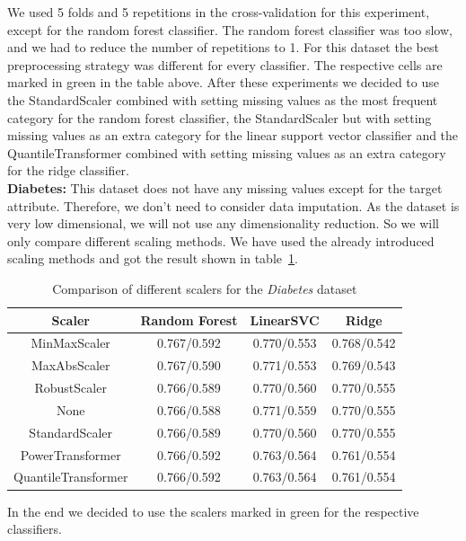 \documentclass[a4paper,10pt]{article}
\begin{document}
We used 5 folds and 5 repetitions in the cross-validation for this experiment, except for the random forest
classifier. The random forest classifier was too slow, and we had to reduce the number of repetitions to 1.
For this dataset the best
preprocessing strategy was different for every classifier. The respective cells are marked in green in the
table above. After these experiments we decided to use the StandardScaler combined with setting missing
values as the most frequent category for the random forest classifier, the StandardScaler but with setting
missing values as an extra category for the linear support vector classifier and the QuantileTransformer
combined with setting missing values as an extra category for the ridge classifier.\\
\textbf{Diabetes:} This dataset does not have any missing values except for the target attribute. Therefore, we 
 don't need to consider data imputation. As the dataset is very low dimensional, we will not use any dimensionality reduction. 
 So we will only compare different scaling methods. We have used the already introduced scaling methods 
 and got the result shown in table~\ref{table:diabetesscalers}.
 \begin{table}[h!]
\centering
\begin{tabular}{|c|c|c|c|}
\hline
\textbf{Scaler} & \textbf{Random Forest } & \textbf{LinearSVC } & \textbf{Ridge } \\
\hline
MinMaxScaler & \cellcolor[HTML]{C1E1C1}0.767/0.592 & 0.770/0.553 & 0.768/0.542 \\
\hline
MaxAbsScaler & 0.767/0.590 & 0.771/0.553 & 0.769/0.543 \\
\hline
RobustScaler & 0.766/0.589 & 0.770/0.560 & 0.770/0.555 \\
\hline
None & 0.766/0.588 & \cellcolor[HTML]{C1E1C1}0.771/0.559 & 0.770/0.555 \\
\hline
StandardScaler & 0.766/0.589 & 0.770/0.560 & \cellcolor[HTML]{C1E1C1}0.770/0.555 \\
\hline
PowerTransformer & 0.766/0.592 & 0.763/0.564 & 0.761/0.554 \\
\hline
QuantileTransformer & 0.766/0.592 & 0.763/0.564 & 0.761/0.554 \\
\hline
\end{tabular}
\caption{Comparison of different scalers for the \textit{Diabetes} dataset}
\label{table:diabetesscalers}
\end{table}
In the end we decided to use the scalers marked in green for the respective classifiers.\\
\end{document}
